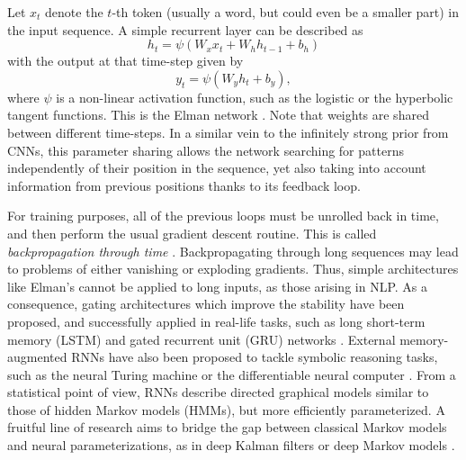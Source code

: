 Let $x_t$ denote the $t$-th token (usually a word, but could even be 
a smaller part) in the input sequence. A simple recurrent layer can be described as
$$
h_t = \psi(W_x x_t + W_h h_{t-1} + b_h)
$$
with the output at that time-step given by
$$
y_t = \psi(W_y h_t + b_y),
$$
where $\psi$ is a non-linear activation function, such as the logistic or the hyperbolic tangent functions. This is the Elman network \parencite{cruse2006neural}. Note that weights are shared between different time-steps. In a similar vein to the infinitely strong prior from CNNs, this parameter sharing allows the network searching for patterns independently of their position in the sequence, yet also taking into account information from previous positions thanks to its feedback loop.

For training purposes, all of the previous loops must be unrolled back in time, and then perform the usual gradient descent routine.
This is called \emph{backpropagation through time} \parencite{58337}.
Backpropagating through long sequences may lead to problems
of either vanishing or exploding gradients. Thus, 
simple architectures like Elman's cannot be applied to long inputs, as those arising in NLP. 
As a consequence, gating architectures which improve the stability have been proposed, and successfully applied in real-life tasks,
such as long 
short-term memory (LSTM) \parencite{hochreiter1997long} and gated recurrent unit (GRU) networks \parencite{cho2014learning}. 
External memory-augmented RNNs have also been proposed to tackle symbolic reasoning tasks, such as the neural Turing machine \parencite{graves2014neural} or the differentiable neural computer \parencite{graves2016hybrid}.
From a statistical point of view, RNNs describe directed graphical models similar to those of hidden Markov models (HMMs), but more efficiently parameterized. A fruitful line of research aims to bridge the gap between classical Markov models and neural parameterizations, as in deep Kalman filters \parencite{krishnan2015deep} or deep Markov models \parencite{krishnan2016structured}.



